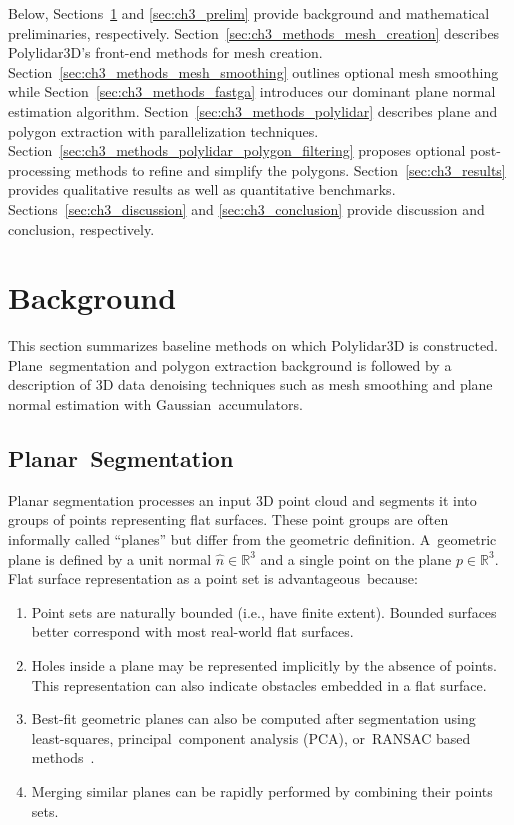 Below, Sections~\ref{sec:ch3_background} and \ref{sec:ch3_prelim} provide background and mathematical preliminaries, respectively. Section~\ref{sec:ch3_methods_mesh_creation} describes Polylidar3D's front-end methods for mesh creation. Section~\ref{sec:ch3_methods_mesh_smoothing} outlines optional mesh smoothing while Section~\ref{sec:ch3_methods_fastga} introduces our dominant plane normal estimation algorithm. Section~\ref{sec:ch3_methods_polylidar} describes plane and polygon extraction with parallelization techniques. Section~\ref{sec:ch3_methods_polylidar_polygon_filtering} proposes optional post-processing methods to refine and simplify the polygons.  Section~\ref{sec:ch3_results} provides qualitative results as well as quantitative benchmarks. Sections~\ref{sec:ch3_discussion} and \ref{sec:ch3_conclusion} provide discussion and conclusion, respectively. 

 
\section{Background}\label{sec:ch3_background}


This section summarizes baseline methods on which Polylidar3D is constructed.  Plane~segmentation and polygon extraction background is followed by a description of 3D data denoising techniques such as mesh smoothing and plane normal estimation with Gaussian~accumulators.

\subsection{Planar~Segmentation}\label{sec:ch3_bg_plane_extraction}

Planar segmentation processes an input 3D point cloud and segments it into groups of points representing flat surfaces. These point groups are often informally called  ``planes'' but differ from the geometric definition.  A~geometric plane is defined by a unit normal $\hat{n} \in \mathbb{R}^3$ and a single point on the plane $p \in \mathbb{R}^3$. Flat surface representation as a point set is advantageous~because:
\begin{enumerate}
    \item Point sets are naturally bounded (i.e.,  have finite extent). Bounded surfaces better correspond with most real-world flat surfaces.
    \item Holes inside a plane may be represented implicitly by the absence of points. This representation can also indicate obstacles embedded in a flat surface.
    \item Best-fit geometric planes can also be computed after segmentation using least-squares, principal~component analysis (PCA), or~RANSAC based methods~\cite{kaiser_survey_2019}.
    \item Merging similar planes can be rapidly performed by combining their points sets.
\end{enumerate}


